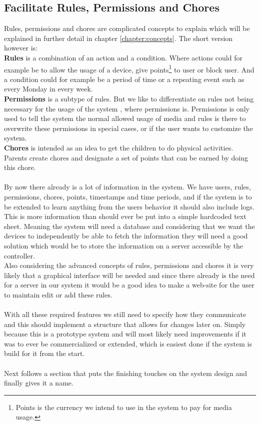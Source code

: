 \subsection{Facilitate Rules, Permissions and Chores}
Rules, permissions and chores are complicated concepts to explain which will be explained in further detail in chapter \ref{chapter:concepts}. The short version however is:\\
\textbf{Rules} is a combination of an action and a condition. Where actions could for example be to allow the usage of a device, give points\footnote{Points is the currency we intend to use in the system to pay for media usage.} to user or block user. And a condition could for example be a period of time or a repeating event such as every Monday in every week.\\
\textbf{Permissions} is a subtype of rules. But we like to differentiate on rules not being necessary for the usage of the system , where permissions is. Permissions is only used to tell the system the normal allowed usage of media and rules is there to overwrite these permissions in special cases, or if the user wants to customize the system.\\
\textbf{Chores} is intended as an idea to get the children to do physical activities. Parents create chores and designate a set of points that can be earned by doing this chore.\\
\\
By now there already is a lot of information in the system. We have users, rules, permissions, chores, points, timestamps and time periods, and if the system is to be extended to learn anything from the users behavior it should also include logs.\\
This is more information than should ever be put into a simple hardcoded text sheet. Meaning the system will need a database and considering that we want the devices to independently be able to fetch the information they will need a good solution which would be to store the information on a server accessible by the controller.\\
Also considering the advanced concepts of rules, permissions and chores it is very likely that a graphical interface will be needed and since there already is the need for a server in our system it would be a good idea to make a web-site for the user to maintain edit or add these rules.\\
\\
With all these required features we still need to specify how they communicate and this should implement a structure that allows for changes later on. Simply because this is a prototype system and will most likely need improvements if it was to ever be commercialized or extended, which is easiest done if the system is build for it from the start.\\
\\
Next follows a section that puts the finishing touches on the system design and finally gives it a name.


